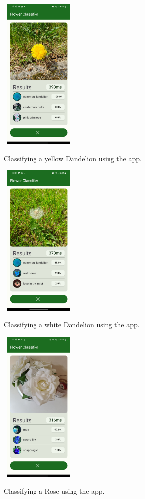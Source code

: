 \documentclass[12pt,a4paper]{report}
\begin{document}
\begin{figure}[h]\
    \includegraphics[width=0.3\textwidth]{dandelion.jpg}
    \caption{Classifying a yellow Dandelion using the app.}
    \label{fig:dandelion}
\end{figure}

\begin{figure}[h]\
    \includegraphics[width=0.3\textwidth]{dandelion_2.jpg}
    \caption{Classifying a white Dandelion using the app.}
    \label{fig:dandelion_2}
\end{figure}


\begin{figure}[h]\
    \includegraphics[width=0.3\textwidth]{rose.jpg}
    \caption{Classifying a Rose using the app.}
    \label{fig:rose}
\end{figure}
\end{document}
